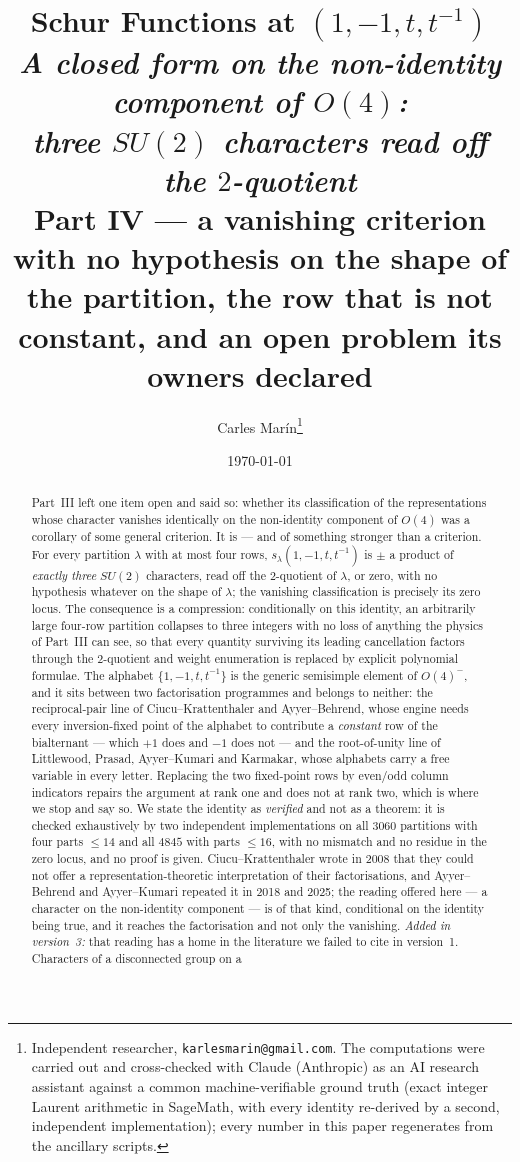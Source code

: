 \documentclass[11pt,a4paper]{article}
\title{\textbf{\Large Schur Functions at $(1,-1,t,t^{-1})$}\\[7pt]
\large\textnormal{\itshape A closed form on the non-identity component of $O(4)$:\\
three $SU(2)$ characters read off the $2$-quotient}\\[8pt]
\normalsize\textnormal{Part IV --- a vanishing criterion with no hypothesis on the shape of
the partition, the row that is not constant, and an open problem its owners declared}}
\author{Carles Mar\'in\thanks{Independent researcher, \texttt{karlesmarin@gmail.com}.
The computations were carried out and cross-checked with Claude (Anthropic) as an AI
research assistant against a common machine-verifiable ground truth (exact integer Laurent
arithmetic in SageMath, with every identity re-derived by a second, independent
implementation); every number in this paper regenerates from the ancillary scripts.}}
\date{\today}
\begin{document}
\maketitle

\begin{abstract}
\noindent
Part~III left one item open and said so: whether its classification of the representations
whose character vanishes identically on the non-identity component of $O(4)$ was a corollary of
some general criterion. It is --- and of something stronger than a criterion. For every
partition $\lambda$ with at most four rows,
$s_\lambda(1,-1,t,t^{-1})$ is $\pm$ a product of \emph{exactly three} $SU(2)$ characters, read
off the $2$-quotient of $\lambda$, or zero, with no hypothesis whatever on the shape of
$\lambda$; the vanishing classification is precisely its zero locus. The consequence is a
compression: conditionally on this identity, an arbitrarily large four-row partition collapses
to three integers with no loss of anything the physics of Part~III can see, so that every
quantity surviving its leading cancellation factors through the $2$-quotient and weight
enumeration is replaced by explicit polynomial formulae. The alphabet
$\{1,-1,t,t^{-1}\}$ is the generic semisimple element of $O(4)^-$, and it sits between two
factorisation programmes and belongs to neither: the reciprocal-pair line of
Ciucu--Krattenthaler and Ayyer--Behrend, whose engine needs every inversion-fixed point of the
alphabet to contribute a \emph{constant} row of the bialternant --- which $+1$ does and $-1$
does not --- and the root-of-unity line of Littlewood, Prasad, Ayyer--Kumari and Karmakar,
whose alphabets carry a free variable in every letter. Replacing the two fixed-point rows by
even/odd column indicators repairs the argument at rank one and does not at rank two, which is
where we stop and say so. We state the identity as \emph{verified} and not as a theorem: it is
checked exhaustively by two independent implementations on all $3060$ partitions with four
parts $\le14$ and all $4845$ with parts $\le16$, with no mismatch and no residue in the zero
locus, and no proof is given. Ciucu--Krattenthaler wrote in 2008 that they could not offer a
representation-theoretic interpretation of their factorisations, and Ayyer--Behrend and
Ayyer--Kumari repeated it in 2018 and 2025; the reading offered here --- a character on the
non-identity component --- is of that kind, conditional on the identity being true, and it
reaches the factorisation and not only the vanishing. \emph{Added in version~3:} that reading has a
home in the literature we failed to cite in version~1. Characters of a disconnected group on a

\end{abstract}
\end{document}
